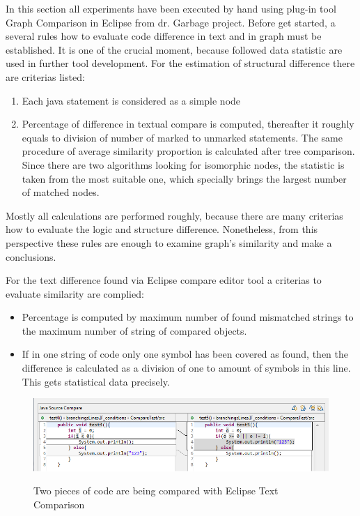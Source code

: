\documentclass{report}
\begin{document}
In this section all experiments have been executed by hand using plug-in tool Graph Comparison in Eclipse from dr. Garbage project. Before get started, a several rules how to evaluate code difference in text and in graph must be established. It is one of the crucial moment, because followed data statistic are used in further tool development. For the estimation of structural difference there are criterias listed:
\begin{enumerate}
	\item Each java statement is considered as a simple node
	\item Percentage of difference in textual compare is computed, thereafter it roughly equals to division of number of marked to unmarked statements. The same procedure of average similarity proportion is calculated after tree comparison. Since there are two algorithms looking for isomorphic nodes, the statistic is taken from the most suitable one, which specially brings the largest number of matched nodes.
\end{enumerate}

Mostly all calculations are performed roughly, because there are many criterias how to evaluate the logic and structure difference. Nonetheless, from this perspective these rules are enough to examine graph's similarity and make a conclusions.

For the text difference found via Eclipse compare editor tool a criterias to evaluate similarity are complied:
\begin{itemize}
	\item Percentage is computed by maximum number of found mismatched strings to the maximum number of string of compared objects.
	\item If in one string of code only one symbol has been covered as found, then the difference is calculated as a division of one to amount of symbols in this line. This gets statistical data precisely.
\end{itemize}

\begin{figure}[h]
  \centering
  \includegraphics[scale = 0.5]{Figures/Java-flowchart-exp/example-graph.png}\\[0.1cm]
  \caption[Two pieces of code are compared with Eclipse text compare editor]{Two pieces of code are being compared with Eclipse Text Comparison}
  \label{fig:example-graph}
\end{figure}
\end{document}
